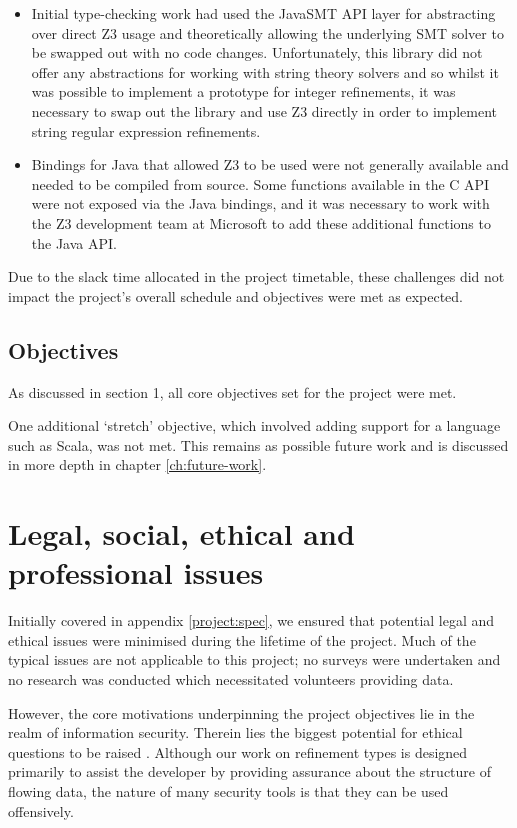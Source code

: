 \documentclass[a4paper,openany,12pt]{book}
\begin{document}
\begin{itemize}
    \item Initial type-checking work had used the JavaSMT API layer for abstracting over direct Z3 usage and
    theoretically allowing the underlying SMT solver to be swapped out with no code changes. Unfortunately,
    this library did not offer any abstractions for working with string theory solvers and so whilst it was
    possible to implement a prototype for integer refinements, it was necessary to swap out the library and use
    Z3 directly in order to implement string regular expression refinements.
    \item Bindings for Java that allowed Z3 to be used were not generally available and needed to be compiled from source.
    Some functions available in the C API were not exposed via the Java bindings, and it was necessary to work with
    the Z3 development team at Microsoft to add these additional functions to the Java API.
\end{itemize}

Due to the slack time allocated in the project timetable, these challenges did not impact the project's overall
schedule and objectives were met as expected.

\section{Objectives}

As discussed in section 1, all core objectives set for the project were met.

One additional `stretch' objective, which involved adding support for a language such as Scala, was not met.
This remains as possible future work and is discussed in more depth in chapter \ref{ch:future-work}.

\chapter[Legal, social, ethical and professional issues]{Legal, social, ethical and\\professional issues}

Initially covered in appendix \ref{project:spec}, we ensured that potential legal and ethical issues were minimised
during the lifetime of the project.
Much of the typical issues are not applicable to this project; no surveys were undertaken and no research was
conducted which necessitated volunteers providing data.

However, the core motivations underpinning the project objectives lie in the realm of information security.
Therein lies the biggest potential for ethical questions to be raised \citep{dark2008ethics}.
Although our work on refinement types is designed primarily to assist the developer by providing assurance about the
structure of flowing data, the nature of many security tools is that they can be used offensively.
\end{document}
